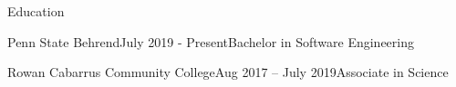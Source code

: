 \begin{basicSection}{Education}
    \begin{educationSection}{Penn State Behrend}{July 2019 - Present}{Bachelor in Software Engineering} \end{educationSection}
    \begin{educationSection}{Rowan Cabarrus Community College}{Aug 2017 – July 2019}{Associate in Science} \end{educationSection}
\end{basicSection}